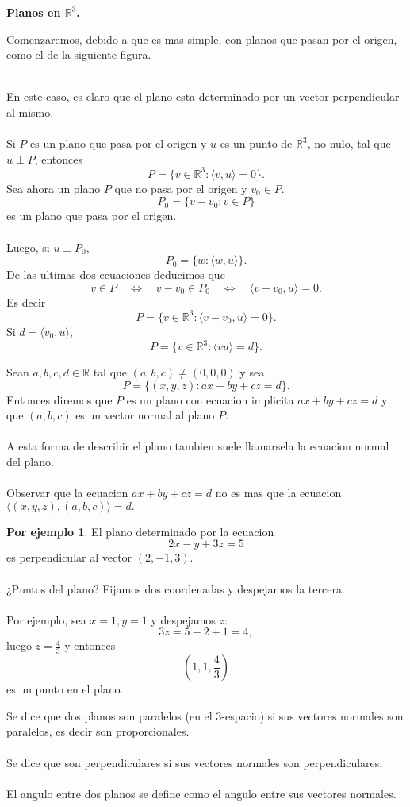 \documentclass{article}
\theoremstyle{definition}
\theoremstyle{definition}
\newtheorem*{ej}{Por ejemplo}
\theoremstyle{remark}
\begin{document}
\begin{center}
  \textbf{Planos en $\mathbb{R}^3$.}
\end{center}
Comenzaremos, debido a que es mas simple, con planos que pasan por el origen, como el de la siguiente figura.
\begin{figure}[h]
\centering
\def\svgwidth{0.75\textwidth}

\end{figure}
\\
En este caso, es claro que el plano esta determinado por un vector perpendicular al mismo.\\\\
Si $P$ es un plano que pasa por el origen y $u$ es un punto de $\mathbb{R}^3$, no nulo, tal que $u \perp P$, entonces \[
  P=\big\{v \in \mathbb{R}^3 : \langle v, u \rangle = 0\big\}.
\]
Sea ahora un plano $P$ que no pasa por el origen y $v_0 \in P$. \[
  P_0=\{v - v_0 : v \in P\}
\]
es un plano que pasa por el origen.
\\\\ Luego, si $u \perp P_0$, \[
  P_0=\big\{w : \langle w , u \rangle \big\}.
\]
De las ultimas dos ecuaciones deducimos que \[
v \in P \quad \Leftrightarrow \quad v - v_0 \in P_0 \quad \Leftrightarrow \quad \langle v - v_0, u \rangle = 0.
\]
Es decir \[
  P= \big\{v \in \mathbb{R}^3 : \langle v - v_0 , u \rangle = 0\big\}.
\]
Si $d= \langle v_0, u\rangle,$ \[
  P= \big\{v \in \mathbb{R}^3 : \langle vu \rangle = d\big\}.
\]
\begin{defi}
  Sean $a,b,c,d \in \mathbb{R}$ tal que $(a,b,c) \neq (0,0,0)$ y sea \[
    P=\big\{(x,y,z) : ax+by+cz=d\big\}.
  \]
  Entonces diremos que $P$ es un plano con ecuacion implicita $ax+by+cz=d$ y que $(a,b,c)$ es un vector normal al plano $P$.\\\\
  A esta forma de describir el plano tambien suele llamarsela la ecuacion normal del plano. \\\\
  Observar que la ecuacion $ax+by+cz=d$ no es mas que la ecuacion $\big\langle (x,y,z),(a,b,c)\big\rangle =d.$
\end{defi}
\begin{ej}
  El plano determinado por la ecuacion \[
2x-y+3z=5
  \] es perpendicular al vector $(2,-1,3)$.
  \\\\
  ¿Puntos del plano? Fijamos dos coordenadas y despejamos la tercera.\\\\ Por ejemplo, sea $x=1, y =1 $ y despejamos $z$: \[
3z=5-2+1=4,
  \]
  luego $z = \frac{4}{3}$ y entonces \[
    \left(1,1,\frac{4}{3}\right)
  \] es un punto en el plano.
\end{ej}
Se dice que dos planos son paralelos (en el 3-espacio) si sus vectores normales son paralelos, es decir son proporcionales.
\\\\
Se dice que son perpendiculares si sus vectores normales son perpendiculares.\\\\
El angulo entre dos planos se define como el angulo entre sus vectores normales.\pagebreak
\end{document}
